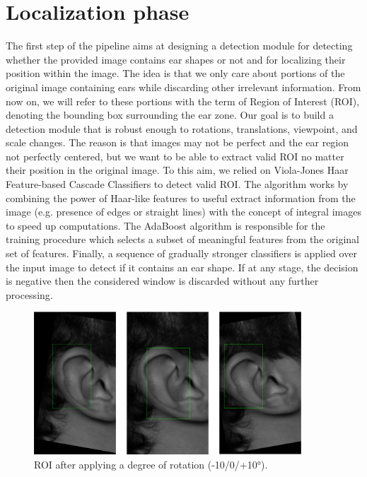 \documentclass{article}
\begin{document}
\section{Localization phase}

The first step of the pipeline aims at designing a detection module for detecting whether the provided image
contains ear shapes or not and for localizing their position within the image. The idea is that we only care
about portions of the original image containing ears while discarding other irrelevant information.
From now on, we will refer to these portions with the term of Region of Interest (ROI), denoting the bounding
box surrounding the ear zone. Our goal is to build a detection module that is robust enough to rotations,
translations, viewpoint, and scale changes. The reason is that images may not be perfect and the ear region
not perfectly centered, but we want to be able to extract valid ROI no matter their position in the original
image. To this aim, we relied on Viola-Jones Haar Feature-based Cascade Classifiers \cite{conf/cvpr/ViolaJ01}
to detect valid ROI.
The algorithm works by combining the power of Haar-like features to useful extract information from the
image (e.g. presence of edges or straight lines) with the concept of integral images to speed up computations.
The AdaBoost algorithm is responsible for the training procedure which selects a subset of meaningful features
from the original set of features. Finally, a sequence of gradually stronger classifiers is applied over the
input image to detect if it contains an ear shape. If at any stage, the decision is negative then the considered
window is discarded without any further processing.

\begin{figure}[h]
    \label{fig:detection}
    \begin{center}
        \includegraphics[width=10cm,keepaspectratio]{images/detection.png}
        \caption{ROI after applying a degree of rotation (-10/0/+10°).}
    \end{center}
\end{figure}
\end{document}
